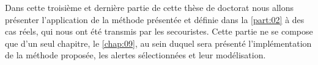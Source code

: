 Dans cette troisième et dernière partie de cette thèse de doctorat
nous allons présenter l’application de la méthode présentée et définie
dans la \autoref{part:02} à des cas réels, qui nous ont été transmis
par les secouristes. Cette partie ne se compose que d'un seul
chapitre, le \ref{chap:09}, au sein duquel sera présenté
l'implémentation de la méthode proposée, les alertes sélectionnées et
leur modélisation.

